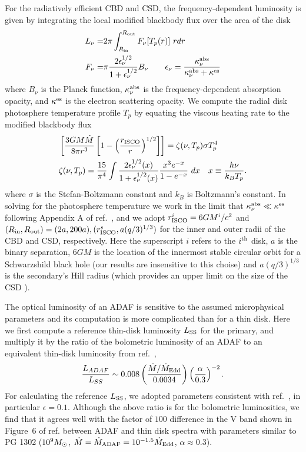 For the radiatively efficient CBD and CSD, the frequency-dependent
luminosity is given by integrating the local modified blackbody flux
over the area of the disk
%
\begin{align}
L_{\nu} =& 2 \pi \int^{R_{\rm out}}_{R_{\rm in}}{F_{\nu}[T_p(r)] \ r dr} \nonumber \\
%
F_{\nu} =& \pi \frac{2 \epsilon^{1/2}_{\nu}}{1 + \epsilon^{1/2}_{\nu} } B_{\nu} \qquad \epsilon_{\nu} = \frac{  \kappa^{\rm abs}_{\nu}  }{  \kappa^{\rm abs}_{\nu} +  \kappa^{\rm es}}
\label{Eq:LandF}
\end{align}
%
where $B_{\nu}$ is the Planck function, $ \kappa^{\rm abs}_{\nu}$ is
the frequency-dependent absorption opacity, and $\kappa^{\rm es}$ is
the electron scattering opacity. We compute the radial disk
photosphere temperature profile $T_p$ by equating the viscous heating
rate to the modified blackbody flux
%
\begin{align}
\label{Eq:Tp}
& \left[ \frac{3GM\dot{M}}{8 \pi r^3 }  \left[ 1 -  \left(\frac{r_{\rm{ISCO}}}{r}\right)^{1/2}\right]  \right] = \zeta(\nu, T_p) \sigma T^4_p  \\ \nonumber
%
& \zeta(\nu, T_p) = \frac{15}{\pi^4} \int{   \frac{2 \epsilon^{1/2}_{\nu}(x)}{1 + \epsilon^{1/2}_{\nu}(x) }  \frac{x^3 e^{-x}}{1- e^{-x}}  \ dx }  \quad x \equiv \frac{h \nu}{k_B T_p}.
\end{align}
%
where $\sigma$ is the Stefan-Boltzmann constant and $k_B$ is
Boltzmann's constant. In solving for the photosphere temperature we
work in the limit that $\kappa^{\rm abs}_{\nu} \ll \kappa^{\rm es}$
following Appendix A of ref.~\cite{TanakaMenou:2010}, and we adopt
$r^i_{\rm{ISCO}}=6GM^i/c^2$ and $(R_{\rm in}, R_{\rm out}) =
(2a,200a), (r^s_{\rm{ISCO}}, a (q/3)^{1/3})$ for the inner and outer
radii of the CBD and CSD, respectively. Here the superscript $i$
refers to the $i^{\rm{th}}$ disk, $a$ is the binary separation, $6GM$
is the location of the innermost stable circular orbit for a
Schwarzshild black hole (our results are insensitive to this choise)
and $a(q/3)^{1/3}$ is the secondary's Hill radius (which provides an
upper limit on the size of the CSD \cite{AL94}).

The optical luminosity of an ADAF is sensitive to the assumed
microphysical parameters and its computation is more complicated than
for a thin disk.  Here we first compute a reference thin-disk
luminosity $L_{\rm SS}$ for the primary, and multiply it by the ratio
of the bolometric luminosity of an ADAF to an equivalent thin-disk
luminosity from ref.~\cite{Mahadevan:1997},
\begin{align}
\frac{L_{ADAF}}{L_{SS}} \sim 0.008  \left( \frac{ \dot{M} / \dot{M}_{\rm{Edd}}}{0.0034}\right)  \left( \frac{\alpha}{0.3} \right)^{-2}.
\label{Eq:LADAF}
\end{align}
For calculating the reference $L_{\rm SS}$, we adopted parameters
consistent with ref.~\cite{Mahadevan:1997}, in particular
$\epsilon=0.1$.  Although the above ratio is for the bolometric
luminosities, we find that it agrees well with the factor of $100$
difference in the V band shown in Figure~6 of
ref. \cite{NMQ:ADAF:1998} between ADAF and thin disk spectra with
parameters similar to PG 1302 ($10^9 {M_{\odot}}$, $\dot{M} =
\dot{M}_{\rm{ADAF}}=10^{-1.5} \dot{M}_{\rm{Edd}}$, $\alpha \approx
0.3$).

